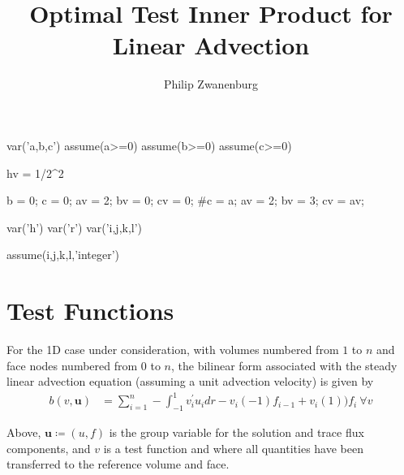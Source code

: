 \documentclass{article}
\title{Optimal Test Inner Product for Linear Advection}
\author{Philip Zwanenburg}
\numberwithin{equation}{section}
\newcommand{\varg}[1]{\mathit{\bm{{#1}}}} %
\newcommand{\jump}[1]{{\llbracket #1\rrbracket}}
\begin{document}
\maketitle


\begin{sagesilent}
var('a,b,c')
assume(a>=0)
assume(b>=0)
assume(c>=0)

hv = 1/2^2

b = 0; c = 0; av = 2; bv = 0; cv = 0;
#c = a; av = 2; bv = 3; cv = av;
\end{sagesilent}


\begin{sagesilent}
var('h')
var('r')
var('i,j,k,l')

assume(i,j,k,l,'integer')
\end{sagesilent}

\section{Test Functions}

For the 1D case under consideration, with volumes numbered from $1$ to $n$ and face nodes numbered from $0$ to $n$, the
bilinear form associated with the steady linear advection equation (assuming a unit advection velocity) is given by
\begin{align} \label{eq:bilinear_adv}
b(v,\varg{u}) 
& = \sum_{i=1}^n -\int_{-1}^{1} v_i^{'} u_i dr - v_i(-1)f_{i-1}+v_{i}(1))f_i\ \forall v
\end{align}

Above, $\varg{u} \coloneqq (u,f)$ is the group variable for the solution and trace flux components, and $v$ is a test
function and where all quantities have been transferred to the reference volume and face.
\\~
\end{document}
